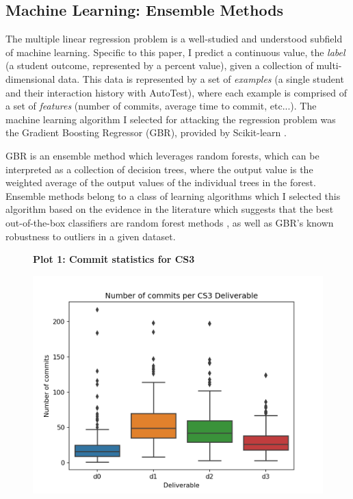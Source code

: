 \documentclass[sigchi]{acmart}
\begin{document}
\subsection{Machine Learning: Ensemble Methods}
The multiple linear regression problem is a well-studied and understood subfield of machine learning. Specific to this paper, I predict a continuous value, the \textit{label} (a student outcome, represented by a percent value), given a collection of multi-dimensional data. This data is represented by a set of \textit{examples} (a single student and their interaction history with AutoTest), where each example is comprised of a set of \textit{features} (number of commits, average time to commit, etc...). The machine learning algorithm I selected for attacking the regression problem was the Gradient Boosting Regressor (GBR), provided by Scikit-learn \cite{scikit-learn}.
\par GBR is an ensemble method which leverages random forests, which can be interpreted as a collection of decision trees, where the output value is the weighted average of the output values of the individual trees in the forest. Ensemble methods belong to a class of learning algorithms which  I selected this algorithm based on the evidence in the literature which suggests that the best out-of-the-box classifiers are random forest methods \cite{Fernandez-Delgado:2014:WNH:2627435.2697065}, as well as GBR's known robustness to outliers in a given dataset.

\begin{figure}
    \centering
    \textbf{Plot 1: Commit statistics for CS3}\par\medskip
  \includegraphics[width=\linewidth]{cs3-commit-boxplot.png}
\end{figure}
\end{document}
